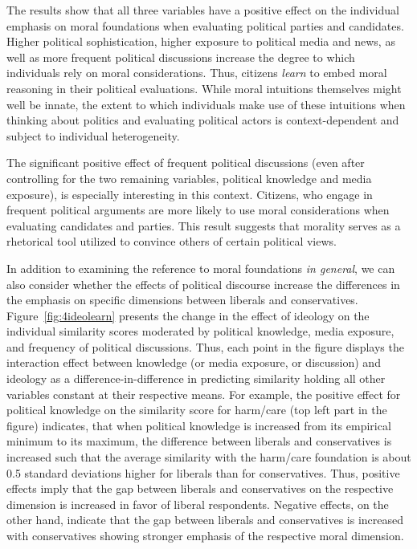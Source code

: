 \documentclass[12pt]{article}
\begin{document}
The results show that all three variables have a positive effect on the individual emphasis on moral foundations when evaluating political parties and candidates. Higher political sophistication, higher exposure to political media and news, as well as more frequent political discussions increase the degree to which individuals rely on moral considerations. Thus, citizens \textit{learn} to embed moral reasoning in their political evaluations. While moral intuitions themselves might well be innate, the extent to which individuals make use of these intuitions when thinking about politics and evaluating political actors is context-dependent and subject to individual heterogeneity.

The significant positive effect of frequent political discussions (even after controlling for the two remaining variables, political knowledge and media exposure), is especially interesting in this context. Citizens, who engage in frequent political arguments are more likely to use moral considerations when evaluating candidates and parties. This result suggests that morality serves as a rhetorical tool utilized to convince others of certain political views.

In addition to examining the reference to moral foundations \textit{in general}, we can also consider whether the effects of political discourse increase the differences in the emphasis on specific dimensions between liberals and conservatives. Figure~\ref{fig:4ideolearn} presents the change in the effect of ideology on the individual similarity scores moderated by political knowledge, media exposure, and frequency of political discussions. Thus, each point in the figure displays the interaction effect between knowledge (or media exposure, or discussion) and ideology as a difference-in-difference in predicting similarity holding all other variables constant at their respective means. For example, the positive effect for political knowledge on the similarity score for harm/care (top left part in the figure) indicates, that when political knowledge is increased from its empirical minimum to its maximum, the difference between liberals and conservatives is increased such that the average similarity with the harm/care foundation is about 0.5 standard deviations higher for liberals than for conservatives. Thus, positive effects imply that the gap between liberals and conservatives on the respective dimension is increased in favor of liberal respondents. Negative effects, on the other hand, indicate that the gap between liberals and conservatives is increased with conservatives showing stronger emphasis of the respective moral dimension.
\end{document}

